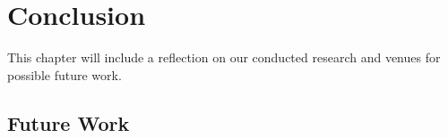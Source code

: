\chapter{Conclusion}
\label{chapter:conclusion}

This chapter will include a reflection on our conducted research and venues
for possible future work.

\section{Future Work}



